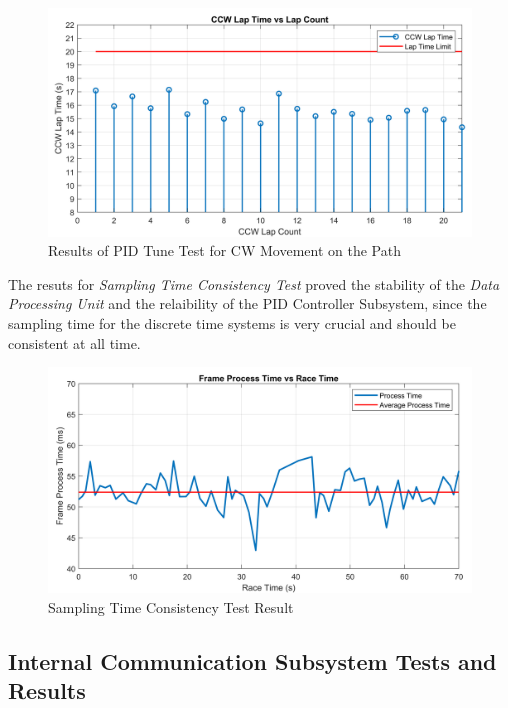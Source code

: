 \documentclass[a4paper,12pt]{article}
\begin{document}
	\begin{figure}[H]
		\includegraphics[width=\textwidth,center]{images/ROT_ROI/ccwLapTime_crop}
		\caption{\label{fig:cwLapTime} Results of PID Tune Test for CW Movement on the Path}
	\end{figure}
	
	The resuts for \textit{ Sampling Time Consistency Test} proved the stability of the \textit{Data Processing Unit} and the relaibility of the PID Controller Subsystem, since the sampling time for the discrete time systems is very crucial and should be consistent at all time. 
	
	\begin{figure}[H]
		\includegraphics[width=\textwidth,center]{images/ROT_ROI/ProcessTime_crop}
		\caption{Sampling Time Consistency Test Result }\label{fig:blockdiagram}
	\end{figure}




\subsection {Internal Communication Subsystem Tests and Results}
\end{document}
